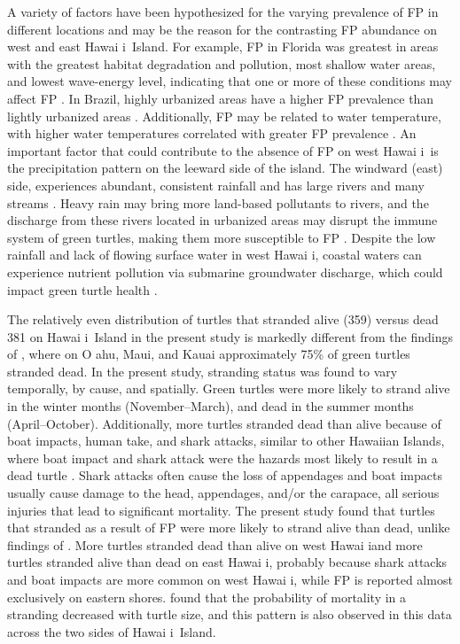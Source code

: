 \documentclass[sn-basic,NameDate]{sn-jnl}\usepackage[]{graphicx}\usepackage[]{xcolor}
\DeclareRobustCommand{\okina}{%
  \raisebox{\dimexpr\fontcharht\font`A-\height}{%
    \scalebox{0.8}{`}%
  }%
}
\newcommand{\Hawaii}{Hawai\okina i}
\newcommand{\Oahu}{O\okina ahu}
\begin{document}
A variety of factors have been hypothesized for the varying prevalence of FP in different locations and may be the reason for the contrasting FP abundance on west and east \Hawaii\ Island.
For example, FP in Florida was greatest in areas with the greatest habitat degradation and pollution, most shallow water areas, and lowest wave-energy level, indicating that one or more of these conditions may affect FP \citep{foley2005fibropapillomatosis}.
In Brazil, highly urbanized areas have a higher FP prevalence than lightly urbanized areas \citep{bastos2022coastal}. 
Additionally, FP may be related to water temperature, with higher water temperatures correlated with greater FP prevalence \citep{manes2022occurrence}. 
An important factor that could contribute to the absence of FP on west \Hawaii\ is the precipitation pattern on the leeward side of the island.
The windward (east) side, experiences abundant, consistent rainfall and has large rivers and many streams \citep{juvik1998atlas}. 
Heavy rain may bring more land-based pollutants to rivers, and the discharge from these rivers located in urbanized areas may disrupt the immune system of green turtles, making them more susceptible to FP \citep{manes2022occurrence}. 
Despite the low rainfall and lack of flowing surface water in west \Hawaii, coastal waters can experience nutrient pollution via submarine groundwater discharge, which could impact green turtle health \citep{abaya2018spatial, abaya2018multi, panelo2022spatial}.
	
The relatively even distribution of turtles that stranded alive (359) versus dead 381 on \Hawaii\ Island in the present study is markedly different from the findings of \cite{chaloupka2008cause}, where on \Oahu, Maui, and Kauai approximately 75\% of green turtles stranded dead. 
In the present study, stranding status was found to vary temporally, by cause, and spatially. 
Green turtles were more likely to strand alive in the winter months (November--March), and dead in the summer months (April--October).
Additionally, more turtles stranded dead than alive because of boat impacts, human take, and shark attacks, similar to other Hawaiian Islands, where boat impact and shark attack were the hazards most likely to result in a dead turtle \citep{chaloupka2008cause}.
Shark attacks often cause the loss of appendages and boat impacts usually cause damage to the head, appendages, and/or the carapace, all serious injuries that lead to significant mortality.
The present study found that turtles that stranded as a result of FP were more likely to strand alive than dead, unlike findings of \cite{chaloupka2008cause}. 
More turtles stranded dead than alive on west \Hawaii and more turtles stranded alive than dead on east \Hawaii, probably because shark attacks and boat impacts are more common on west \Hawaii, while FP is reported almost exclusively on eastern shores. 
\cite{chaloupka2008cause} found that the probability of mortality in a stranding decreased with turtle size, and this pattern is also observed in this data across the two sides of \Hawaii\ Island.
\end{document}
